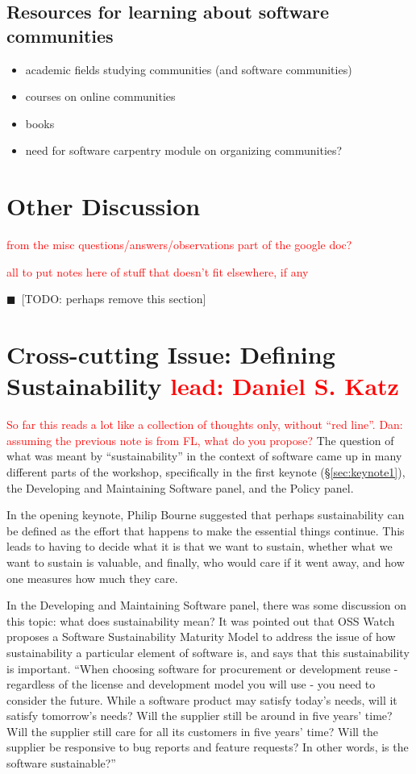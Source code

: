 \documentclass[11pt, oneside]{amsart}
\newcommand{\todo}[1]{{\color{blue}$\blacksquare$~\textsf{[TODO: #1]}}}
\newcommand{\note}[1]{ {\textcolor{red}    { #1 }}}
\begin{document}
\subsection{Resources for learning about software communities}
\begin{itemize}
\item academic fields studying communities (and software communities)
\item courses on online communities
\item books
\item need for software carpentry module on organizing communities?
\end{itemize}

\section{Other Discussion} \label{sec:other}

\note{from the misc questions/answers/observations part of the google doc?}

\note{all to put notes here of stuff that doesn't fit elsewhere, if any}

\todo{perhaps remove this section}


\section{Cross-cutting Issue: Defining Sustainability \note{lead: Daniel S. Katz}}  \label{sec:cross-cutting}

\note{So far this reads a lot like a collection of thoughts only, without ``red line''.}
\note{Dan: assuming the previous note is from FL, what do you propose?}
The question of what was meant by ``sustainability'' in the context of software
came up in many different parts of the workshop, specifically in the first
keynote (\S\ref{sec:keynote1}), the Developing and Maintaining Software panel,
and the Policy panel.

In the opening keynote, Philip Bourne suggested that perhaps sustainability can
be defined as the effort that happens to make the essential things continue.
This leads to having to decide what it is that we want to sustain, whether what
we want to sustain is valuable, and finally, who would care if it went away,
and how one measures how much they care.

In the Developing and Maintaining Software panel, there was some discussion on
this topic: what does sustainability mean? It was pointed out that OSS Watch
proposes a Software Sustainability Maturity Model to address the issue of how
sustainability a particular element of software is, and says that this
sustainability is important. ``When choosing software for procurement or
development reuse - regardless of the license and development model you will
use - you need to consider the future. While a software product may satisfy
today's needs, will it satisfy tomorrow's needs? Will the supplier still be
around in five years' time? Will the supplier still care for all its customers
in five years' time? Will the supplier be responsive to bug reports and feature
requests? In other words, is the software sustainable?''~\cite{OSS-ssmm-web}
\end{document}
